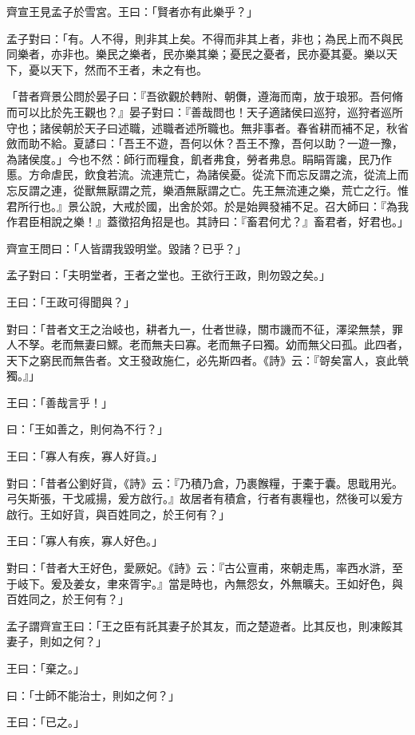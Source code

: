 \documentclass[12pt,a4paper]{ctexbook}
\begin{document}
齊宣王見孟子於雪宮。王曰：「賢者亦有此樂乎？」\par
孟子對曰：「有。人不得，則非其上矣。不得而非其上者，非也；為民上而不與民同樂者，亦非也。樂民之樂者，民亦樂其樂；憂民之憂者，民亦憂其憂。樂以天下，憂以天下，然而不王者，未之有也。\par
「昔者齊景公問於晏子曰：『吾欲觀於轉附、朝儛，遵海而南，放于琅邪。吾何脩而可以比於先王觀也？』晏子對曰：『善哉問也！天子適諸侯曰巡狩，巡狩者巡所守也；諸侯朝於天子曰述職，述職者述所職也。無非事者。春省耕而補不足，秋省斂而助不給。夏諺曰：「吾王不遊，吾何以休？吾王不豫，吾何以助？一遊一豫，為諸侯度。」今也不然：師行而糧食，飢者弗食，勞者弗息。睊睊胥讒，民乃作慝。方命虐民，飲食若流。流連荒亡，為諸侯憂。從流下而忘反謂之流，從流上而忘反謂之連，從獸無厭謂之荒，樂酒無厭謂之亡。先王無流連之樂，荒亡之行。惟君所行也。』景公說，大戒於國，出舍於郊。於是始興發補不足。召大師曰：『為我作君臣相說之樂！』蓋徵招角招是也。其詩曰：『畜君何尤？』畜君者，好君也。」\par
齊宣王問曰：「人皆謂我毀明堂。毀諸？已乎？」\par
孟子對曰：「夫明堂者，王者之堂也。王欲行王政，則勿毀之矣。」\par
王曰：「王政可得聞與？」\par
對曰：「昔者文王之治岐也，耕者九一，仕者世祿，關市譏而不征，澤梁無禁，罪人不孥。老而無妻曰鰥。老而無夫曰寡。老而無子曰獨。幼而無父曰孤。此四者，天下之窮民而無告者。文王發政施仁，必先斯四者。《詩》云：『哿矣富人，哀此煢獨。』」\par
王曰：「善哉言乎！」\par
曰：「王如善之，則何為不行？」\par
王曰：「寡人有疾，寡人好貨。」\par
對曰：「昔者公劉好貨，《詩》云：『乃積乃倉，乃裹餱糧，于橐于囊。思戢用光。弓矢斯張，干戈戚揚，爰方啟行。』故居者有積倉，行者有裹糧也，然後可以爰方啟行。王如好貨，與百姓同之，於王何有？」\par
王曰：「寡人有疾，寡人好色。」\par
對曰：「昔者大王好色，愛厥妃。《詩》云：『古公亶甫，來朝走馬，率西水滸，至于岐下。爰及姜女，聿來胥宇。』當是時也，內無怨女，外無曠夫。王如好色，與百姓同之，於王何有？」\par
孟子謂齊宣王曰：「王之臣有託其妻子於其友，而之楚遊者。比其反也，則凍餒其妻子，則如之何？」\par
王曰：「棄之。」\par
曰：「士師不能治士，則如之何？」\par
王曰：「已之。」\par
\end{document}
